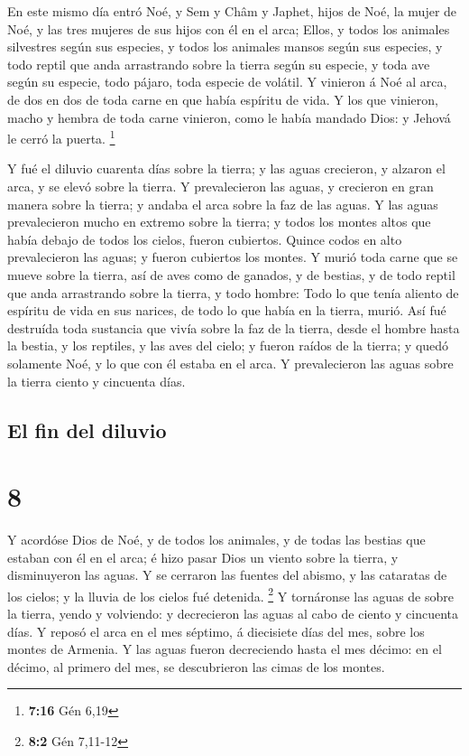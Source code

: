  En este mismo día entró Noé, y Sem y Châm y Japhet, hijos
de Noé, la mujer de Noé, y las tres mujeres de sus hijos con él en el
arca;  Ellos, y todos los animales silvestres según sus
especies, y todos los animales mansos según sus especies, y todo reptil
que anda arrastrando sobre la tierra según su especie, y toda ave según
su especie, todo pájaro, toda especie de volátil.  Y
vinieron á Noé al arca, de dos en dos de toda carne en que había
espíritu de vida.  Y los que vinieron, macho y hembra de
toda carne vinieron, como le había mandado Dios: y Jehová le cerró la
puerta. \footnote{\textbf{7:16} Gén 6,19}

 Y fué el diluvio cuarenta días sobre la tierra; y las
aguas crecieron, y alzaron el arca, y se elevó sobre la tierra.
 Y prevalecieron las aguas, y crecieron en gran manera
sobre la tierra; y andaba el arca sobre la faz de las aguas.
 Y las aguas prevalecieron mucho en extremo sobre la
tierra; y todos los montes altos que había debajo de todos los cielos,
fueron cubiertos.  Quince codos en alto prevalecieron las
aguas; y fueron cubiertos los montes.  Y murió toda carne
que se mueve sobre la tierra, así de aves como de ganados, y de bestias,
y de todo reptil que anda arrastrando sobre la tierra, y todo hombre:
 Todo lo que tenía aliento de espíritu de vida en sus
narices, de todo lo que había en la tierra, murió.  Así fué
destruída toda sustancia que vivía sobre la faz de la tierra, desde el
hombre hasta la bestia, y los reptiles, y las aves del cielo; y fueron
raídos de la tierra; y quedó solamente Noé, y lo que con él estaba en el
arca.  Y prevalecieron las aguas sobre la tierra ciento y
cincuenta días.

\hypertarget{el-fin-del-diluvio}{%
\subsection{El fin del diluvio}\label{el-fin-del-diluvio}}

\hypertarget{section-7}{%
\section{8}\label{section-7}}

 Y acordóse Dios de Noé, y de todos los animales, y de todas
las bestias que estaban con él en el arca; é hizo pasar Dios un viento
sobre la tierra, y disminuyeron las aguas.  Y se cerraron
las fuentes del abismo, y las cataratas de los cielos; y la lluvia de
los cielos fué detenida. \footnote{\textbf{8:2} Gén 7,11-12}
 Y tornáronse las aguas de sobre la tierra, yendo y
volviendo: y decrecieron las aguas al cabo de ciento y cincuenta días.
 Y reposó el arca en el mes séptimo, á diecisiete días del
mes, sobre los montes de Armenia.  Y las aguas fueron
decreciendo hasta el mes décimo: en el décimo, al primero del mes, se
descubrieron las cimas de los montes.

